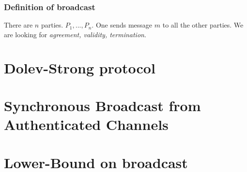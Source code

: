     \begin{frame}
        \frametitle{Definition of broadcast}
            There are $n$ parties. $P_1, ..., P_n$. One sends message $m$ to all the other parties. We are looking for \textit{agreement, validity, termination}. 
    \end{frame}


\section{Dolev-Strong protocol}


\section{Synchronous Broadcast from Authenticated Channels}


\section{Lower-Bound on broadcast}






